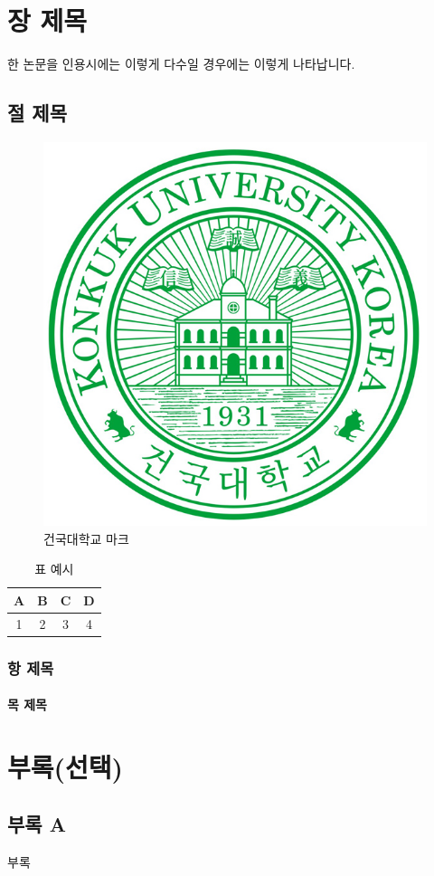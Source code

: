 \documentclass[11pt]{report}
\begin{document}
\cleardoublepage

% 
%
\chapter{장 제목}
한 논문을 인용시에는 \cite{Weinberg:1967tq} 이렇게 다수일 경우에는 이렇게  \cite{Glashow:1961tr,Salam:1964ry,Glashow:1970gm} 나타납니다.

\section{절 제목}

\begin{figure}[h] \centering
\begin{center}
\includegraphics[width=.1\textwidth]{UI_Mark.jpg}
\caption{건국대학교 마크}
\end{center}
\end{figure}


\jiwon[4-5]

\begin{table}[h]
\begin{center}
\begin{tabular}{|c|c|c|c|}
  \hline
  A & B & C & D\\
  \hline
  1 & 2 & 3 & 4\\
  \hline
\end{tabular}
\end{center}
\caption{표 예시}
\end{table}

\subsection{항 제목}
\jiwon[6]
\subsubsection{목 제목}
\jiwon[7]


% 
%
\printbibliography[title={\normalfont\fontsize{16}{16}\bfseries 참고문헌}]

\cleardoublepage
{}  
% 
%

\chapter*{부록(선택)}

\section*{부록 A}
부록

% 
%
% 

\begin{KUabstract}
\lipsum[1]
\end{KUabstract}




\end{document}
